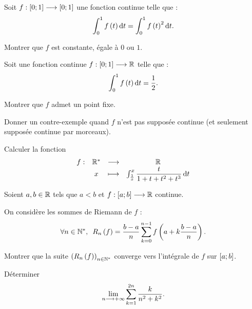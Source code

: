 \begin{corr}
\end{corr}

\begin{exo}
Soit \(f:\left[0;1\right]\longrightarrow\left[0;1\right]\) une fonction continue telle que : \[\int_0^1f\paren{t}\odif{t}=\int_0^1f\paren{t}^2\odif{t}.\]

Montrer que \(f\) est constante, égale à \(0\) ou \(1\).
\end{exo}

\begin{corr}
\end{corr}

\begin{exo}
Soit une fonction continue \(f:\left[0;1\right]\longrightarrow\mathbb{R}\) telle que : \[\int_0^1f\paren{t}\odif{t}=\dfrac{1}{2}.\]

Montrer que \(f\) admet un point fixe.

Donner un contre-exemple quand \(f\) n'est pas supposée continue (et seulement supposée continue par morceaux).
\end{exo}

\begin{corr}
\end{corr}

\begin{exo}
Calculer la fonction \[\fonction{f}{\Rs}{\R}{x}{\int_{\frac{1}{x}}^x\dfrac{t}{1+t+t^2+t^3}\odif{t}}\]
\end{exo}

\begin{corr}
\end{corr}

\begin{exo}
Soient \(a,b\in\mathbb{R}\) tels que \(a<b\) et \(f:\left[a;b\right]\longrightarrow\mathbb{R}\) continue.

On considère les sommes de Riemann de \(f\) : \[\quantifs{\forall n\in\Ns}R_n\paren{f}=\dfrac{b-a}{n}\sum_{k=0}^{n-1}f\paren{a+k\dfrac{b-a}{n}}.\]

Montrer que la suite \(\left(R_n\left(f\right)\right)_{n\in\mathbb{N}^*}\) converge vers l'intégrale de \(f\) sur \(\left[a;b\right]\).
\end{exo}

\begin{corr}
\end{corr}

\begin{exo}
Déterminer \[\lim_{n\longrightarrow+\infty}\sum_{k=1}^{2n}\dfrac{k}{n^2+k^2}.\]
\end{exo}


